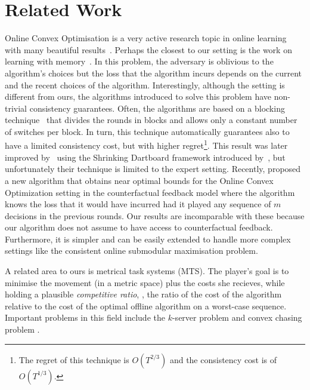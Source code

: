 \section{Related Work}
Online Convex Optimisation is a very active research topic in online learning with many beautiful results~\citep{DBLP:journals/tit/MerhavOSW02}. Perhaps the closest to our setting is the work on learning with memory~\citep{DBLP:journals/tit/MerhavOSW02}. 
In this problem, the adversary is oblivious to the algorithm's choices but the loss that the algorithm incurs depends on the current and the recent choices of the algorithm. 
Interestingly, although the setting is different from ours, the algorithms introduced to solve this problem have non-trivial consistency guarantees. Often, the algorithms  are based on a blocking technique~\citep{DBLP:journals/tit/MerhavOSW02} that divides the rounds in blocks and allows only a constant number of switches per block. 
In turn, this technique automatically guarantees also to have a limited consistency cost, but with higher regret\footnote{The regret of this technique is $O(T^{2/3})$ and the consistency cost is of $O(T^{1/3})$.}. 
This result was later improved by~\cite{DBLP:journals/tit/GyorgyN14} using the Shrinking Dartboard framework introduced by~\cite{DBLP:conf/colt/GeulenVW10}, but unfortunately their technique is limited to the expert setting. Recently, \cite{DBLP:conf/nips/AnavaHM15} proposed a new algorithm that obtains near optimal bounds for the Online Convex Optimization setting in the counterfactual feedback model where the algorithm knows the loss that it would have incurred had it played any sequence of $m$ decisions in the previous rounds. 
Our results are incomparable with these because our algorithm does not assume to have access to counterfactual feedback. Furthermore, it is simpler and can be easily extended to handle more complex settings like the consistent online submodular maximisation problem.

A related area to ours is metrical task systems (MTS). The player's goal is to minimise the movement (in a metric space) plus the costs she recieves, while holding a plausible \emph{competitive ratio}, \ie, the ratio of the cost of the algorithm relative to the cost of the optimal offline algorithm on a worst-case sequence. Important problems in this field include the $k$-server problem \citep{manasse1990competitive,bubeck2017} and convex chasing problem \citep{argue2019nearly}. 

